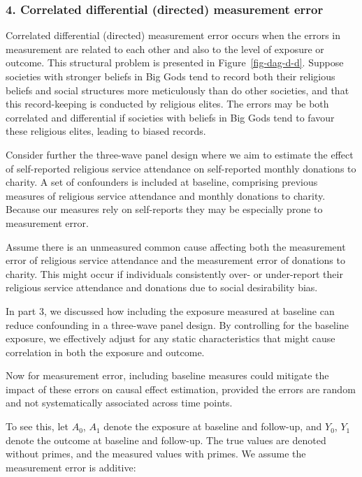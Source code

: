 \documentclass[
  singlecolumn]{report}
\begin{document}
\hypertarget{correlated-differential-directed-measurement-error}{%
\subsubsection{\texorpdfstring{4. \textbf{Correlated differential
(directed) measurement
error}}{4. Correlated differential (directed) measurement error}}\label{correlated-differential-directed-measurement-error}}

Correlated differential (directed) measurement error occurs when the
errors in measurement are related to each other and also to the level of
exposure or outcome. This structural problem is presented in
Figure~\ref{fig-dag-d-d}. Suppose societies with stronger beliefs in Big
Gods tend to record both their religious beliefs and social structures
more meticulously than do other societies, and that this record-keeping
is conducted by religious elites. The errors may be both correlated and
differential if societies with beliefs in Big Gods tend to favour these
religious elites, leading to biased records.

Consider further the three-wave panel design where we aim to estimate
the effect of self-reported religious service attendance on
self-reported monthly donations to charity. A set of confounders is
included at baseline, comprising previous measures of religious service
attendance and monthly donations to charity. Because our measures rely
on self-reports they may be especially prone to measurement error.

Assume there is an unmeasured common cause affecting both the
measurement error of religious service attendance and the measurement
error of donations to charity. This might occur if individuals
consistently over- or under-report their religious service attendance
and donations due to social desirability bias.

In part 3, we discussed how including the exposure measured at baseline
can reduce confounding in a three-wave panel design. By controlling for
the baseline exposure, we effectively adjust for any static
characteristics that might cause correlation in both the exposure and
outcome.

Now for measurement error, including baseline measures could mitigate
the impact of these errors on causal effect estimation, provided the
errors are random and not systematically associated across time points.

To see this, let \(A_0\), \(A_1\) denote the exposure at baseline and
follow-up, and \(Y_0\), \(Y_1\) denote the outcome at baseline and
follow-up. The true values are denoted without primes, and the measured
values with primes. We assume the measurement error is additive:
\end{document}
